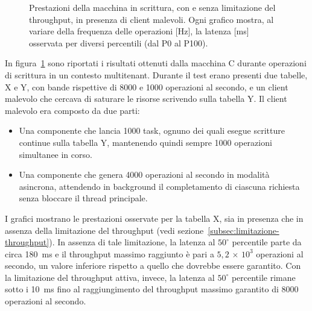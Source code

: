 \begin{figure}[htbp]
    \caption{Prestazioni della macchina in scrittura, con e senza limitazione del throughput, in presenza di client malevoli. Ogni grafico mostra, al variare della frequenza delle operazioni [Hz], la latenza [ms] osservata per diversi percentili (dal P0 al P100).}
    \label{fig:bench-throttling}
\end{figure}

In figura~\ref{fig:bench-throttling} sono riportati i risultati ottenuti dalla macchina C durante operazioni di scrittura in un contesto multitenant.
Durante il test erano presenti due tabelle, X e Y, con bande rispettive di 8000 e 1000 operazioni al secondo, e un client malevolo che cercava di saturare le risorse scrivendo sulla tabella Y.
Il client malevolo era composto da due parti:
\begin{itemize}
    \item Una componente che lancia 1000 task, ognuno dei quali esegue scritture continue sulla tabella Y, mantenendo quindi sempre 1000 operazioni simultanee in corso.
    \item Una componente che genera 4000 operazioni al secondo in modalità asincrona, attendendo in background il completamento di ciascuna richiesta senza bloccare il thread principale.
\end{itemize}

I grafici mostrano le prestazioni osservate per la tabella X, sia in presenza che in assenza della limitazione del throughput (vedi sezione~\ref{subsec:limitazione-throughput}).
In assenza di tale limitazione, la latenza al $50^\circ$ percentile parte da circa 180~ms e il throughput massimo raggiunto è pari a $5{,}2\,{\times}\,10^3$ operazioni al secondo, un valore inferiore rispetto a quello che dovrebbe essere garantito.
Con la limitazione del throughput attiva, invece, la latenza al $50^\circ$ percentile rimane sotto i 10~ms fino al raggiungimento del throughput massimo garantito di 8000 operazioni al secondo.
